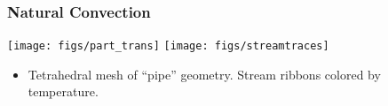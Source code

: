 \begin{frame}[t]
  \frametitle{Natural Convection}
  \begin{center}
    \texttt{[image: figs/part\_trans]}
    \texttt{[image: figs/streamtraces]}
  \end{center}
  \begin{block}{}
    \begin{itemize}
    \item{
      Tetrahedral mesh of ``pipe'' geometry.
      Stream ribbons colored by temperature.
      }
      \end{itemize}
  \end{block}
\end{frame}

